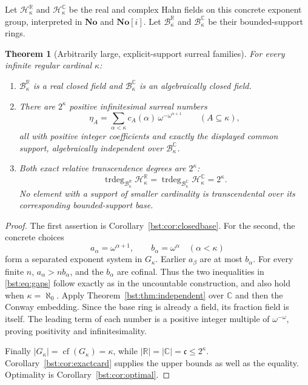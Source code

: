 \documentclass[11pt,letterpaper]{article}
\newtheorem{theorem}{Theorem}[section]
\theoremstyle{definition}
\theoremstyle{remark}
\newcommand{\R}{\mathbb R}
\newcommand{\C}{\mathbb C}
\newcommand{\No}{\mathbf{No}}
\newcommand{\trdeg}{\operatorname{trdeg}}
\newcommand{\cof}{\operatorname{cf}}
\newcommand{\cc}{\mathfrak c}
\begin{document}
Let $\mathscr H_\kappa^{\R}$ and $\mathscr H_\kappa^{\C}$ be the real and
complex Hahn fields on this concrete exponent group, interpreted in
$\No$ and $\No[i]$. Let $\mathscr B_\kappa^{\R}$ and
$\mathscr B_\kappa^{\C}$ be their bounded-support rings.

\begin{theorem}[Arbitrarily large, explicit-support surreal families]\label{bst:thm:kappa}
For every infinite regular cardinal $\kappa$:
\begin{enumerate}
\item $\mathscr B_\kappa^{\R}$ is a real closed field and
$\mathscr B_\kappa^{\C}$ is an algebraically closed field.
\item There are $2^\kappa$ positive infinitesimal surreal numbers
\begin{equation}\label{bst:eq:kappaxi}
 \eta_A=\sum_{\alpha<\kappa}
     c_A(\alpha)\,\omega^{-\omega^{\alpha+1}}
     \qquad(A\subseteq\kappa),
\end{equation}
all with positive integer coefficients and exactly the displayed common
support, algebraically independent over $\mathscr B_\kappa^{\C}$.
\item Both exact relative transcendence degrees are $2^\kappa$:
\[
 \trdeg_{\mathscr B_\kappa^{\R}}\mathscr H_\kappa^{\R}
 =\trdeg_{\mathscr B_\kappa^{\C}}\mathscr H_\kappa^{\C}
 =2^\kappa.
\]
No element with a support of smaller cardinality is transcendental over
its corresponding bounded-support base.
\end{enumerate}
\end{theorem}
\begin{proof}
The first assertion is Corollary~\ref{bst:cor:closedbase}. For the second, the
concrete choices
\[
 a_\alpha=\omega^{\alpha+1},\qquad b_\alpha=\omega^\alpha
 \quad(\alpha<\kappa)
\]
form a separated exponent system in $G_\kappa$. Earlier $a_\beta$ are at
most $b_\alpha$. For every finite $n$, $a_\alpha>n b_\alpha$, and the
$b_\alpha$ are cofinal. Thus the two inequalities in \eqref{bst:eq:gaps}
follow exactly as in the uncountable construction, and also hold when
$\kappa=\aleph_0$. Apply Theorem~\ref{bst:thm:independent} over $\C$ and then
the Conway embedding. Since the base ring is already a field, its fraction
field is itself. The leading term of each number is a positive integer
multiple of $\omega^{-\omega}$, proving positivity and infinitesimality.

Finally $|G_\kappa|=\cof(G_\kappa)=\kappa$, while
$|\R|=|\C|=\cc\le2^\kappa$. Corollary~\ref{bst:cor:exactcard} supplies the
upper bounds as well as the equality. Optimality is
Corollary~\ref{bst:cor:optimal}.
\end{proof}
\end{document}
